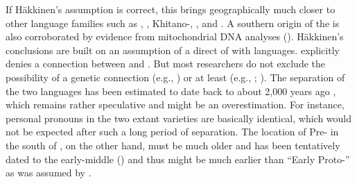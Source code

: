 \noindent If Häkkinen’s assumption is correct, this brings  geographically much closer to other language families such as , , Khitano-, , and . A southern origin of the  is also corroborated by evidence from mitochondrial DNA analyses (\citealt{VolodkoStarikovskaya2008}). Häkkinen’s conclusions are built on an assumption of a direct  of  with  languages. \citet[61]{Janhunen2009} explicitly denies a connection between  and . But most researchers do not exclude the possibility of a genetic connection (e.g., \citealt{Pispane2013}) or at least  (e.g., \citealt{Rédei1999}; \citealt{Aikio2014}). The separation of the two  languages has been estimated to date back to about 2,000 years ago \citep[28]{Maslova2003a}, which remains rather speculative and might be an overestimation. For instance, personal pronouns in the two extant  varieties are basically identical, which would not be expected after such a long period of separation. The location of Pre- in the south of , on the other hand, must be much older and has been tentatively dated to the early-middle  (\citealt[1097]{VolodkoStarikovskaya2008}) and thus might be much earlier than “Early Proto-” as was assumed by \cite[93]{Häkkinen2012}.